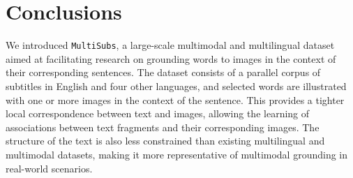 \documentclass[twocolumn]{svjour3}          \smartqed  \usepackage{graphicx}
\newcommand{\multisubs}{\texttt{MultiSubs}\xspace}
\begin{document}
\begin{table}[t]
    \caption{ALI scores for the lexical translation task on the test set, comparing an MFT baseline, text-only, image-only, and multimodal models trained on different subsets of the data. }
    \label{tbl:mlt-ali}
    \centering
\end{table}





\section{Conclusions}
\label{sec:conclusion}

We introduced \multisubs, a large-scale multimodal and multilingual dataset aimed at facilitating research on grounding words to images in the context of their corresponding sentences. The dataset consists of a parallel corpus of subtitles in English and four other languages, and selected words are illustrated with one or more images in the context of the sentence. This provides a tighter local correspondence between text and images, allowing the learning of associations between text fragments and their corresponding images. The structure of the text is also less constrained than existing multilingual and multimodal datasets, making it more representative of multimodal grounding in real-world scenarios. 
\end{document}
